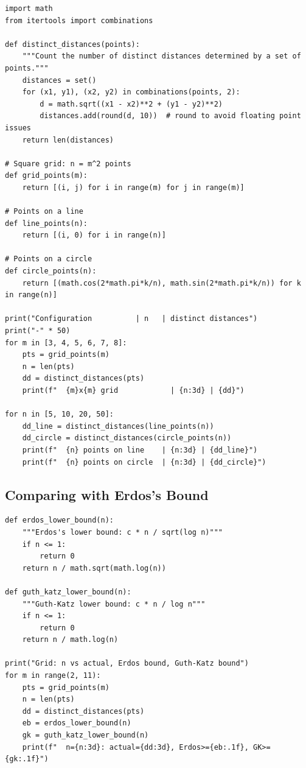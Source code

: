 \begin{verbatim}
import math
from itertools import combinations

def distinct_distances(points):
    """Count the number of distinct distances determined by a set of points."""
    distances = set()
    for (x1, y1), (x2, y2) in combinations(points, 2):
        d = math.sqrt((x1 - x2)**2 + (y1 - y2)**2)
        distances.add(round(d, 10))  # round to avoid floating point issues
    return len(distances)

# Square grid: n = m^2 points
def grid_points(m):
    return [(i, j) for i in range(m) for j in range(m)]

# Points on a line
def line_points(n):
    return [(i, 0) for i in range(n)]

# Points on a circle
def circle_points(n):
    return [(math.cos(2*math.pi*k/n), math.sin(2*math.pi*k/n)) for k in range(n)]

print("Configuration          | n   | distinct distances")
print("-" * 50)
for m in [3, 4, 5, 6, 7, 8]:
    pts = grid_points(m)
    n = len(pts)
    dd = distinct_distances(pts)
    print(f"  {m}x{m} grid            | {n:3d} | {dd}")

for n in [5, 10, 20, 50]:
    dd_line = distinct_distances(line_points(n))
    dd_circle = distinct_distances(circle_points(n))
    print(f"  {n} points on line    | {n:3d} | {dd_line}")
    print(f"  {n} points on circle  | {n:3d} | {dd_circle}")
\end{verbatim}

\subsection{Comparing with Erdos's Bound}

\begin{verbatim}
def erdos_lower_bound(n):
    """Erdos's lower bound: c * n / sqrt(log n)"""
    if n <= 1:
        return 0
    return n / math.sqrt(math.log(n))

def guth_katz_lower_bound(n):
    """Guth-Katz lower bound: c * n / log n"""
    if n <= 1:
        return 0
    return n / math.log(n)

print("Grid: n vs actual, Erdos bound, Guth-Katz bound")
for m in range(2, 11):
    pts = grid_points(m)
    n = len(pts)
    dd = distinct_distances(pts)
    eb = erdos_lower_bound(n)
    gk = guth_katz_lower_bound(n)
    print(f"  n={n:3d}: actual={dd:3d}, Erdos>={eb:.1f}, GK>={gk:.1f}")
\end{verbatim}

